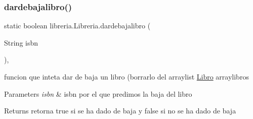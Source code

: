 \subsubsection{\texorpdfstring{dardebajalibro()}{dardebajalibro()}}
{\footnotesize\ttfamily static boolean libreria.\+Libreria.\+dardebajalibro (\begin{DoxyParamCaption}\item[{String}]{isbn }\end{DoxyParamCaption})\hspace{0.3cm}{\ttfamily [inline]}, {\ttfamily [static]}}

funcion que inteta dar de baja un libro (borrarlo del arraylist \mbox{\hyperlink{classlibreria_1_1_libro}{Libro}} arraylibros 
\begin{DoxyParams}{Parameters}
{\em isbn} & isbn por el que predimos la baja del libro \\
\hline
\end{DoxyParams}
\begin{DoxyReturn}{Returns}
retorna true si se ha dado de baja y false si no se ha dado de baja 
\end{DoxyReturn}

